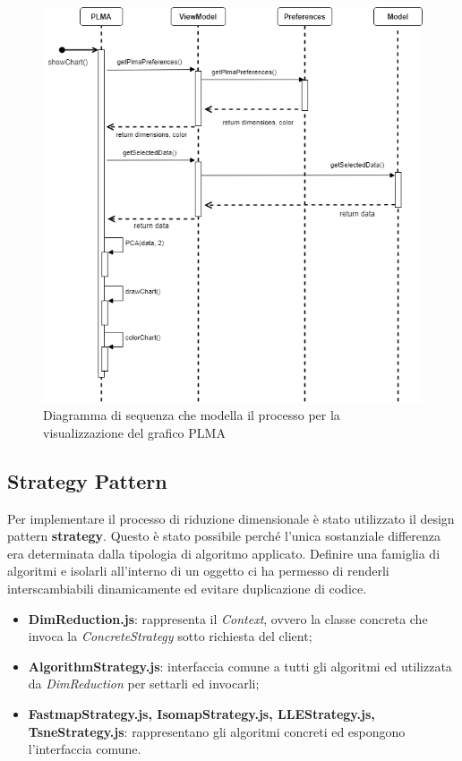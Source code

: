 \vfill
\newpage
\vspace*{\fill}
\begin{figure}[hb]
\includegraphics[width=15.5cm]{Images/Allegato Tecnico-Sequenza-PLMA}
\centering
\caption{Diagramma di sequenza che modella il processo per la visualizzazione del grafico PLMA}
\end{figure}
\vfill
\newpage

\subsection{Strategy Pattern}
Per implementare il processo di riduzione dimensionale è stato utilizzato il design pattern \textbf{strategy}. Questo è stato possibile perché l'unica sostanziale differenza era determinata dalla tipologia di algoritmo applicato. Definire una famiglia di algoritmi e isolarli all'interno di un oggetto ci ha permesso di renderli interscambiabili dinamicamente ed evitare duplicazione di codice. 
\begin{itemize}
\item \textbf{DimReduction.js}: rappresenta il \textit{Context}, ovvero la classe concreta che invoca la \textit{ConcreteStrategy} sotto richiesta del client;
\item \textbf{AlgorithmStrategy.js}: interfaccia comune a tutti gli algoritmi ed utilizzata da \textit{DimReduction} per settarli ed invocarli;
\item \textbf{FastmapStrategy.js, IsomapStrategy.js, LLEStrategy.js, TsneStrategy.js}: rappresentano gli algoritmi concreti ed espongono l'interfaccia comune.
\end{itemize}

